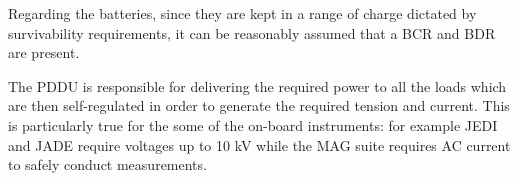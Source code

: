 Regarding the batteries, since they are kept in a range of charge dictated by survivability requirements, it can be reasonably assumed that a BCR and BDR are present. 

The PDDU is responsible for delivering the required power to all the loads which are then self-regulated in order to generate the required tension and current. This is particularly true for the some of the on-board instruments: for example JEDI\cite{JEDI_info} and JADE\cite{JADE_info} require voltages up to 10 kV while the MAG\cite{MAG_info} suite requires AC current to safely conduct measurements.
